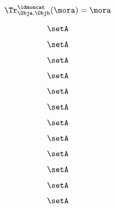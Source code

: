 {\begin{forslides}
    \begin{equation}
        \label{eq:feedback-162}
        \Tr_{\Obja,\Objb}^\idmoncat (\mora)=\mora
    \end{equation}

    \begin{equation}
        \label{eq:feedback-163}
        \setA
    \end{equation}

    \begin{equation}
        \label{eq:feedback-164}
        \setA
    \end{equation}

    \begin{equation}
        \label{eq:feedback-165}
        \setA
    \end{equation}

    \begin{equation}
        \label{eq:feedback-166}
        \setA
    \end{equation}

    \begin{equation}
        \label{eq:feedback-167}
        \setA
    \end{equation}

    \begin{equation}
        \label{eq:feedback-168}
        \setA
    \end{equation}

    \begin{equation}
        \label{eq:feedback-169}
        \setA
    \end{equation}

    \begin{equation}
        \label{eq:feedback-170}
        \setA
    \end{equation}

    \begin{equation}
        \label{eq:feedback-171}
        \setA
    \end{equation}

    \begin{equation}
        \label{eq:feedback-172}
        \setA
    \end{equation}

    \begin{equation}
        \label{eq:feedback-173}
        \setA
    \end{equation}

    \begin{equation}
        \label{eq:feedback-174}
        \setA
    \end{equation}


\end{forslides}}
